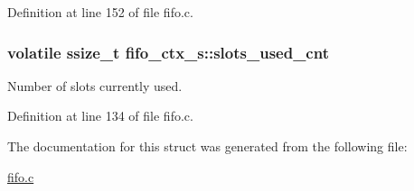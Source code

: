 Definition at line 152 of file fifo.\+c.

\subsubsection[{\texorpdfstring{slots\+\_\+used\+\_\+cnt}{slots_used_cnt}}]{\setlength{\rightskip}{0pt plus 5cm}volatile ssize\+\_\+t fifo\+\_\+ctx\+\_\+s\+::slots\+\_\+used\+\_\+cnt}\hypertarget{structfifo__ctx__s_a566e90d020d2b7a45b6a8879c63106c2}{}\label{structfifo__ctx__s_a566e90d020d2b7a45b6a8879c63106c2}
Number of slots currently used. 

Definition at line 134 of file fifo.\+c.



The documentation for this struct was generated from the following file\+:\begin{DoxyCompactItemize}
\item 
\hyperlink{fifo_8c}{fifo.\+c}\end{DoxyCompactItemize}
